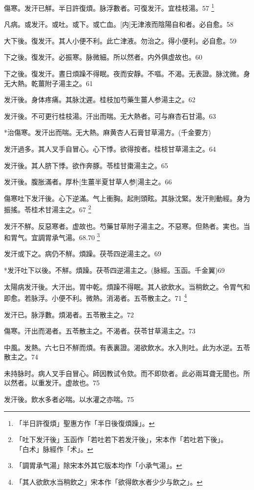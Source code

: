 \documentclass[12pt,oneside,UTF8,b5paper]{ctexbook}她她她她她她她
\begin{document}
傷寒。发汗已觧。半日許復煩。脉浮數者。可復发汗。宜桂枝湯。57
	\footnote{「半日許復煩」聖惠方作「半日後復煩躁」。}

凡病。或发汗。或吐。或下。或亡血。[内]无津液而陰陽自和者。必自愈。58

大下後。復发汗。其人小便不利。此亡津液。勿治之。得小便利。必自愈。59

下之後。復发汗。必振寒。脉微細。所以然者。内外俱虚故也。60

下之後。復发汗。晝日煩躁不得眠。夜而安靜。不嘔。不渴。无表證。脉沈微。身无大熱。乾薑附子湯主之。61

发汗後。身体疼痛。其脉沈遲。桂枝加芍藥生薑人参湯主之。62

发汗後。不可更行桂枝湯。汗出而喘。无大熱者。可与麻杏石甘湯。63

*治傷寒。发汗出而喘。无大熱。麻黄杏人石膏甘草湯方。(千金要方)

发汗過多。其人叉手自冒心。心下悸。欲得按者。桂枝甘草湯主之。64

发汗後。其人脐下悸。欲作奔豚。苓桂甘棗湯主之。65

发汗後。腹胀滿者。厚朴[生薑半夏甘草人参]湯主之。66

傷寒吐下发汗後。心下逆滿。气上衝胸。起則頭眩。其脉沈緊。发汗則動經。身为振搖。苓桂术甘湯主之。67
	\footnote{「吐下发汗後」玉函作「若吐若下若发汗後」，宋本作「若吐若下後」。\\「白术」脉經作「术」。}

发汗不觧。反惡寒者。虚故也。芍藥甘草附子湯主之。不惡寒。但熱者。実也。当和胃气。宜調胃承气湯。68.70
	\footnote{「調胃承气湯」除宋本外其它版本均作「小承气湯」。}

发汗或下之。病仍不觧。煩躁。茯苓四逆湯主之。69

*发汗吐下以後。不觧。煩躁。茯苓四逆湯主之。(脉經。玉函。千金翼)69

太陽病发汗後。大汗出。胃中乾。煩躁不得眠。其人欲飲水。当稍飲之。令胃气和即愈。若脉浮。小便不利。微熱。消渴者。五苓散主之。71
	\footnote{「其人欲飲水当稍飲之」宋本作「欲得飲水者少少与飲之」。}

发汗已。脉浮數。煩渴者。五苓散主之。72

傷寒。汗出而渴者。五苓散主之。不渴者。茯苓甘草湯主之。73

中風。发熱。六七日不觧而煩。有表裏證。渴欲飲水。水入則吐。此为水逆。五苓散主之。74

未持脉时。病人叉手自冒心。師因教试令欬。而不即欬者。此必兩耳聋无聞也。所以然者。以重发汗。虚故也。75

发汗後。飲水多者必喘。以水灌之亦喘。75
\end{document}
